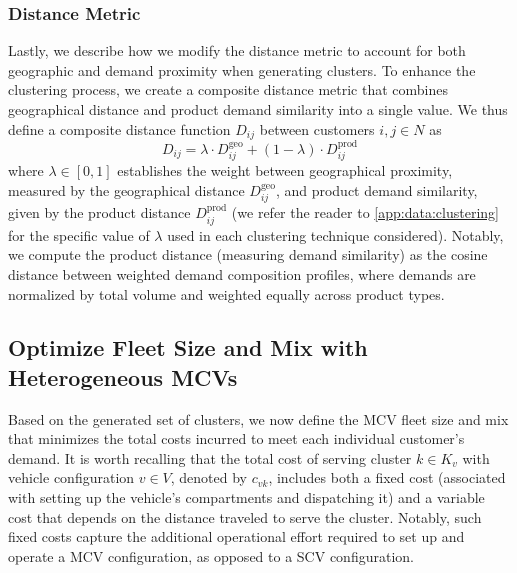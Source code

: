 \documentclass[11pt]{elsarticle}
\theoremstyle{plain}
\begin{document}
\subsubsection{Distance Metric} \label{distance_metric}

Lastly, we describe how we modify the distance metric to account for both geographic and demand proximity when generating clusters.
To enhance the clustering process, we create a composite distance metric that combines geographical distance and product demand similarity into a single value. 
We thus define a composite distance function $D_{ij}$ between customers $i, j \in N$ as
\begin{equation}
    D_{ij} = \lambda \cdot D^{\text{geo}}_{ij} + (1-\lambda) \cdot D^{\text{prod}}_{ij}
\end{equation}
where $\lambda \in [0,1]$ establishes the weight between geographical proximity, measured by the geographical distance $D^{\text{geo}}_{ij}$, and product demand similarity, given by the product distance $D^{\text{prod}}_{ij}$ (we refer the reader to \ref{app:data:clustering} for the specific value of $\lambda$ used in each clustering technique considered). Notably, we compute the product distance (measuring demand similarity) as the cosine distance between weighted demand composition profiles, where demands are normalized by total volume and weighted equally across product types. 

\subsection{Optimize Fleet Size and Mix with Heterogeneous \acp{MCV}} \label{sec:model_formulation}

Based on the generated set of clusters, we now define the \ac{MCV} fleet size and mix that minimizes the total costs incurred to meet each individual customer's demand. It is worth recalling that the total cost of serving cluster $k \in K_v$ with vehicle configuration $v \in V$, denoted by $c_{vk}$, includes both a fixed cost (associated with setting up the vehicle’s compartments and dispatching it) and a variable cost that depends on the distance traveled to serve the cluster. Notably, such fixed costs capture the additional operational effort required to set up and operate a \ac{MCV} configuration, as opposed to a \ac{SCV} configuration.
\end{document}
